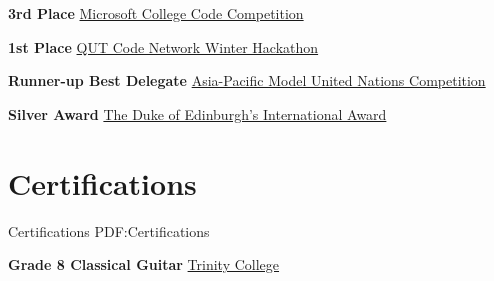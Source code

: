 \documentclass[a4paper,10pt,oneside]{article}
\begin{document}
\begin{body}



\textbf{3rd Place}
\href{https://msft3c.com/}{Microsoft College Code Competition}
\hfill {}
\EntryGap
\EntryGap

\textbf{1st Place}
\href{https://codenetwork.co/hackathon-2017/}{QUT Code Network Winter Hackathon}
\hfill {}
\EntryGap
\EntryGap

\textbf{Runner-up Best Delegate}
\href{http://www.amunc.net/}{Asia-Pacific Model United Nations Competition} 
\hfill {}
\EntryGap
\EntryGap

\textbf{Silver Award}
\href{http://www.dukeofed.com.au/}{The Duke of Edinburgh’s International Award}
\hfill {}
\EntryGap

\section
{Certifications}
{Certifications}
{PDF:Certifications}





\textbf{Grade 8 Classical Guitar}
\href{http://www.trinitycollege.com/}{Trinity College}
\hfill {}




\end{body}
\end{document}
